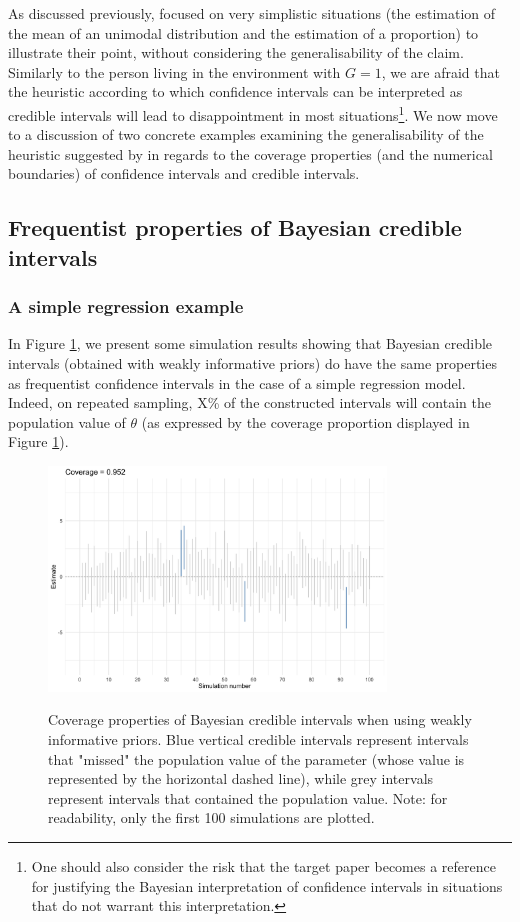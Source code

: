 \documentclass[a4paper,man,natbib,floatsintext,donotrepeattitle]{apa6}
\begin{document}
As discussed previously, \cite{albers_credible_2018} focused on very simplistic situations (the estimation of the mean of an unimodal distribution and the estimation of a proportion) to illustrate their point, without considering the generalisability of the claim. Similarly to the person living in the environment with $G = 1$, we are afraid that the heuristic according to which confidence intervals can be interpreted as credible intervals will lead to disappointment in most situations\footnote{One should also consider the risk that the target paper becomes a reference for justifying the Bayesian interpretation of confidence intervals in situations that do not warrant this interpretation.}. We now move to a discussion of two concrete examples examining the generalisability of the heuristic suggested by \cite{albers_credible_2018} in regards to the coverage properties (and the numerical boundaries) of confidence intervals and credible intervals.

\subsection{Frequentist properties of Bayesian credible intervals}

\subsubsection{A simple regression example}

In Figure \ref{fig:coverage}, we present some simulation results showing that Bayesian credible intervals (obtained with weakly informative priors) do have the same properties as frequentist confidence intervals in the case of a simple regression model. Indeed, on repeated sampling, X\% of the constructed intervals will contain the population value of $\theta$ (as expressed by the coverage proportion displayed in Figure \ref{fig:coverage}).

\begin{figure}[H]
  \caption{Coverage properties of Bayesian credible intervals when using weakly informative priors. Blue vertical credible intervals represent intervals that "missed" the population value of the parameter (whose value is represented by the horizontal dashed line), while grey intervals represent intervals that contained the population value. Note: for readability, only the first 100 simulations are plotted.}
  \centering
  \includegraphics[width=0.8\textwidth]{coverage1.png}
  \label{fig:coverage}
\end{figure}
\end{document}
